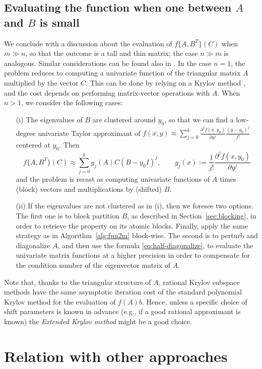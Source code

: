 \documentclass{siamart1116}
\begin{document}
	\subsection{Evaluating the function when one between $A$ and $B$ is small}
We conclude with a discussion about the evaluation 
of $f\{A,B^T\}(C)$ when  $m\gg n$, so that the outcome is a 
tall and thin matrix; 
the case $n\gg m$ is analogous. Similar considerations can be found also in 
\cite{kressner2011bivariate}.
In the case $n=1$, the problem reduces to computing a univariate function of the triangular matrix $A$ multiplied by the vector $C$. This can be done by relying on a Krylov method \cite{guttel2010rational}, and the cost depends on performing matrix-vector operations with $A$. When $n>1$, we consider the following cases:
\begin{itemize}
	\item[(i)]The eigenvalues of $B$ are clustered around $y_0$, so that we can find a low-degree univariate Taylor approximant of $f(x,y)\approx \sum_{j=0}^k \frac{\partial^j f(x, y_0)}{\partial y^j}\frac{(y-y_0)^j}{j!}$ centered at $y_0$. Then
	$$
	f\{A,B^T\}(C)\approx \sum_{j=0}^k 
	g_j(A)C(B-y_0I)^j,\qquad g_j(x):=\frac 1{j!}\frac{\partial^j f(x, y_0)}{\partial y^j}
	$$
	and the problem is recast as computing univariate functions of $A$ times (block) vectors and multiplications by (shifted) $B$.
	\item[(ii)] If the eigenvalues are not clustered as in (i), then we
	foresee two options. The first one is to block partition $B$, as described in Section~\ref{sec:blocking}, in order to retrieve the property on its atomic blocks. Finally, apply the same strategy as 
	in Algorithm~\ref{alg:fun2m} block-wise. The second is to 
	perturb and diagonalize $A$, and then use the formula 
	\eqref{eq:half-diagonalize}, to evaluate the univariate matrix
	functions at a higher precision in order to compensate for the 
	condition number of the eigenvector matrix of $A$. 
\end{itemize}
Note that, thanks to the triangular structure of $A$, rational Krylov subspace methods have the same asymptotic iteration cost of the standard polynomial Krylov method for the evaluation of $f(A)b$. 
Hence, unless a specific choice of shift parameters is known in advance (e.g., if a good rational approximant is known) the \emph{Extended Krylov method} might be a good choice. 

\section{Relation with other approaches}\label{sec:bartels}
\end{document}
